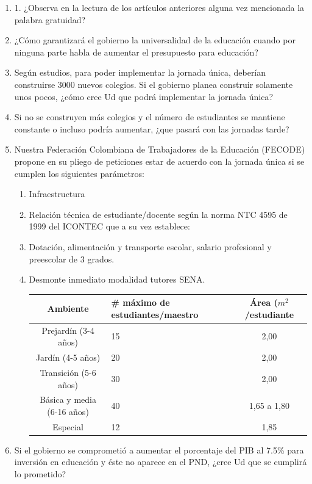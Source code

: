 \documentclass[10pt,twoside]{article}
\begin{document}
\begin{enumerate}
\item 1. ¿Observa en la lectura de los artículos anteriores alguna vez mencionada la palabra gratuidad?
\item ¿Cómo garantizará el gobierno la universalidad de la educación cuando por ninguna parte habla de aumentar el presupuesto para educación?
\item Según estudios, para poder implementar la jornada única, deberían construirse 3000 nuevos colegios. Si el gobierno planea construir solamente unos pocos, ¿cómo cree Ud que podrá implementar la jornada única?
\item Si no se construyen más colegios y el número de estudiantes se mantiene constante o incluso podría aumentar, ¿que pasará con las jornadas tarde?
\item Nuestra Federación Colombiana de Trabajadores de la Educación (FECODE) propone en su pliego de peticiones estar de acuerdo con la jornada única si se cumplen los siguientes parámetros:
\begin{enumerate}
\item Infraestructura
\item Relación técnica de estudiante/docente según la norma NTC 4595 de 1999 del ICONTEC que a su vez establece:
\item Dotación, alimentación y transporte escolar, salario profesional y preescolar de 3 grados.
\item Desmonte inmediato modalidad tutores SENA.
\begin{center}
\begin{tabular}{|c|p{3.5cm}|c|}
\hline 
Ambiente & \# máximo de estudiantes/maestro & Área ($m^{2}$/estudiante \\ 
\hline 
Prejardín (3-4 años) & 15 & 2,00 \\ 
Jardín (4-5 años) & 20 & 2,00 \\ 
Transición (5-6 años) & 30 & 2,00 \\ 
Básica y media (6-16 años) & 40 & 1,65 a 1,80 \\ 
Especial & 12 & 1,85 \\ \hline
\end{tabular} 
\end{center}
\end{enumerate}
\item Si el gobierno se comprometió a aumentar el porcentaje del PIB al 7.5\% para inversión en educación y éste no aparece en el PND, ¿cree Ud que se cumplirá lo prometido?
\begin{center}

\end{center}
\end{enumerate}
\end{document}
